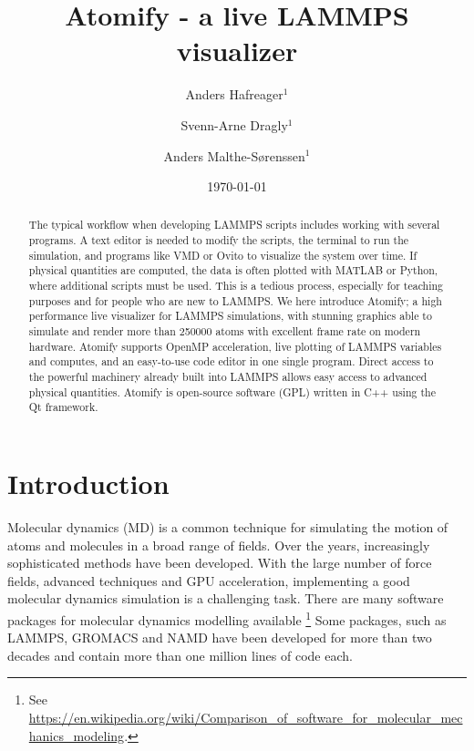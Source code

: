 \documentclass[aps,pre,twocolumn,letterpaper,floatfix]{revtex4-1}
\begin{document}
\title{Atomify - a live LAMMPS visualizer}
\author{Anders Hafreager$^1$}
\author{Svenn-Arne Dragly$^{1}$} 
\author{Anders Malthe-S\o renssen$^1$}
\date{\today} 


\begin{abstract}
%
The typical workflow when developing LAMMPS scripts includes working with
several programs.
A text editor is needed to modify the scripts,
the terminal to run the simulation, and programs like VMD or Ovito to visualize
the system over time.
If physical quantities are computed, the data is often plotted with MATLAB or
Python, where additional scripts must be used.
This is a tedious process, especially for teaching purposes and for people who
are new to LAMMPS.
We here introduce Atomify;
a high performance live visualizer for LAMMPS simulations,
with stunning graphics able to simulate and render more than 250000 atoms with
excellent frame rate on modern hardware.
Atomify supports OpenMP acceleration, live plotting of LAMMPS variables and
computes, and an easy-to-use code editor in one single program.
Direct access to the powerful machinery already built into LAMMPS allows easy
access to advanced physical quantities.
Atomify is open-source software (GPL) written in C++ using the Qt framework.
%
\end{abstract} 
 
\maketitle

\section{Introduction}
%
Molecular dynamics (MD) is a common technique for simulating the motion of atoms
and molecules in a broad range of fields.
Over the years, increasingly sophisticated methods have been developed.
With the large number of force fields, advanced techniques and GPU acceleration,
implementing a good molecular dynamics simulation is a challenging task.
There are many software packages for molecular dynamics modelling
available
\footnote{See \url{https://en.wikipedia.org/wiki/Comparison_of_software_for_molecular_mechanics_modeling}.}
Some packages, such as LAMMPS\cite{Plimpton1995Fast}, GROMACS\cite{Pronk2013}
and NAMD\cite{Phillips2005Scalable} have been developed for more than two decades 
and contain more than one million lines of code each.
\end{document}
